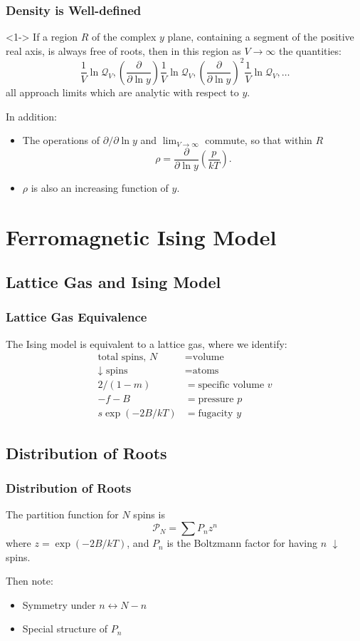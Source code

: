 \documentclass[british]{beamer}
\begin{document}
\frame
{
  \frametitle{Density is Well-defined}

  \begin{theorem}<1->
  If a region $R$ of the complex $y$ plane, containing a segment of the positive real axis, is always free of roots, then in this region as $V\rightarrow \infty$ the quantities: $$\frac{1}{V}\ln \mathcal{Q}_V, \left(\frac{\partial}{\partial \ln y}\right)\frac{1}{V}\ln \mathcal{Q}_V, \left(\frac{\partial}{\partial \ln y}\right)^2\frac{1}{V}\ln \mathcal{Q}_V, \ldots$$ all approach limits which are analytic with respect to $y$.
  \end{theorem}
  
  In addition:
  \begin{itemize}
  \item<2-> The operations of $\partial/\partial \ln y$ and $\lim_{V\rightarrow \infty}$ commute, so that within $R$ $$\rho = \frac{\partial}{\partial \ln y}\left(\frac{p}{kT}\right).$$
  \item<3-> $\rho$ is also an increasing function of $y$.
  \end{itemize}

}

\section{Ferromagnetic Ising Model}
\subsection{Lattice Gas and Ising Model}
\frame
{
  \frametitle{Lattice Gas Equivalence}

  The Ising model is equivalent to a lattice gas, where we identify:
  \begin{align*}
  \textrm{total spins, $N$} &= \textrm{volume} \\
  \textrm{$\downarrow$ spins} &= \textrm{atoms} \\
  2/(1-m) &= \textrm{specific volume $v$} \\
  -f-B &= \textrm{pressure $p$} \\
  s \exp(-2B/kT) &= \textrm{fugacity $y$}
  \end{align*}
}

\subsection{Distribution of Roots}
\frame
{
  \frametitle{Distribution of Roots}

  The partition function for $N$ spins is $$\mathcal{P}_N = \sum P_n z^n$$ where $z = \exp(-2B/kT)$, and $P_n$ is the Boltzmann factor for having $n$ $\downarrow$ spins.

  Then note:
  \begin{itemize}
  \item<2-> Symmetry under $n \leftrightarrow N-n$
  \item<3-> Special structure of $P_n$
  \end{itemize}

}
\end{document}
